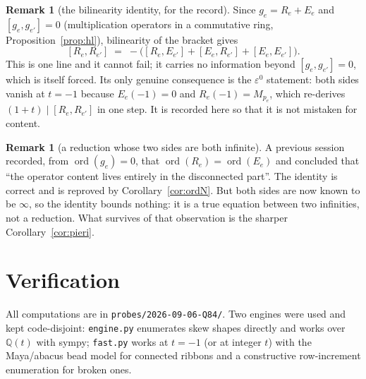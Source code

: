 \documentclass[11pt]{article}
\theoremstyle{plain}
\theoremstyle{definition}
\newtheorem{remark}[theorem]{Remark}
\DeclareMathOperator{\ord}{ord}
\newcommand{\eps}{\varepsilon}
\newcommand{\Q}{\mathbb{Q}}
\begin{document}
\begin{remark}[the bilinearity identity, for the record]\label{rem:q87}
Since $g_e=R_e+E_e$ and $[g_e,g_{e'}]=0$ (multiplication operators in a
commutative ring, Proposition~\ref{prop:hl}), bilinearity of the bracket gives
\[
  [R_e,R_{e'}]\;=\;-\bigl([R_e,E_{e'}]+[E_e,R_{e'}]+[E_e,E_{e'}]\bigr).
\]
This is one line and it cannot fail; it carries no information beyond
$[g_e,g_{e'}]=0$, which is itself forced.  Its only genuine consequence is the
$\eps^0$ statement: both sides vanish at $t=-1$ because $E_e(-1)=0$ and
$R_e(-1)=M_{p_e}$, which re-derives $(1+t)\mid[R_e,R_{e'}]$ in one step.  It is
recorded here so that it is not mistaken for content.
\end{remark}

\begin{remark}[a reduction whose two sides are both infinite]\label{rem:vac}
A previous session recorded, from $\ord(g_e)=0$, that
$\ord(R_e)=\ord(E_e)$ and concluded that ``the operator content lives entirely
in the disconnected part''.  The identity is correct and is reproved by
Corollary~\ref{cor:ordN}.  But both sides are now known to be $\infty$, so the
identity bounds nothing: it is a true equation between two infinities, not a
reduction.  What survives of that observation is the sharper
Corollary~\ref{cor:pieri}.
\end{remark}

\section{Verification}

All computations are in \verb|probes/2026-09-06-Q84/|.  Two engines were used and
kept code-disjoint: \verb|engine.py| enumerates skew shapes directly and works
over $\Q(t)$ with \textsf{sympy}; \verb|fast.py| works at $t=-1$ (or at integer
$t$) with the Maya/abacus bead model for connected ribbons and a constructive
row-increment enumeration for broken ones.
\end{document}
